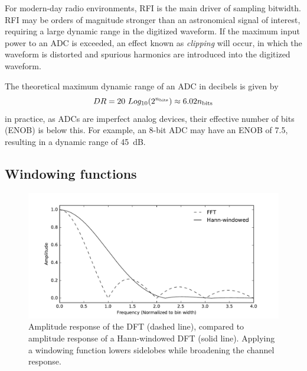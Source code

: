 \documentclass{ws-rv961x669}
\begin{document}
For modern-day radio environments, RFI is the main driver of sampling bitwidth. RFI may be orders of magnitude stronger than an astronomical signal of interest, requiring a large dynamic range in the digitized waveform. If the maximum input power to an ADC is exceeded, an effect known as \emph{clipping} will occur, in which the waveform is distorted and spurious harmonics are introduced into the digitized waveform.

The theoretical maximum dynamic range of an ADC in decibels is given by 
\begin{equation}
	DR = 20~Log_{10}(2^{n_{\rm{bits}}}) \approx 6.02 n_{\rm{bits}}
\end{equation}
in practice, as ADCs are imperfect analog devices, their effective number of bits (ENOB) is below this. For example, an 8-bit ADC may have an ENOB of 7.5, resulting in a dynamic range of 45~dB.



\subsection{Windowing functions}

\begin{figure}[t]
 \centering
 \includegraphics[width=\textwidth]{./figures/fft_resp}
 
 \caption{Amplitude response of the DFT (dashed line), compared to amplitude response of a Hann-windowed DFT (solid line). Applying a windowing function lowers sidelobes while broadening the channel response. \label{fig:fft_resp}}
\end{figure}
\end{document}

